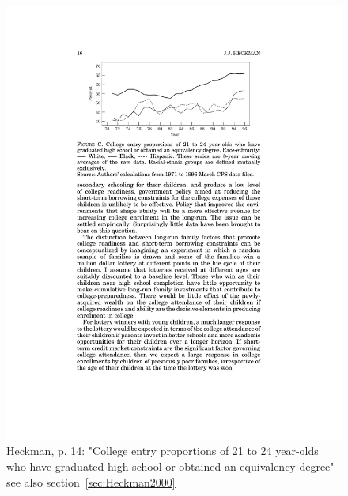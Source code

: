 \documentclass[12pt,a4paper]{article}
\begin{document}
    \begin{figure}[htb]
      \centering
      \includegraphics[width=12cm]{Meeting 10 Policies to foster human capital - Seite 14.pdf}
      \caption{Heckman, p. 14: "College entry proportions of 21 to 24 year-olds who have graduated high school or obtained an equivalency degree" see also section~\ref{sec:Heckman2000}}
      \label{fig:Heckman collegeentry}
    \end{figure}
\end{document}
